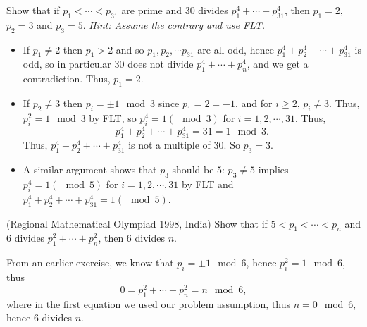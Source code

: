 \documentclass[11pt,dvipsnames]{book}
\numberwithin{figure}{section} %
\numberwithin{table}{section} %
\begin{document}
\begin{exercise} Show that if $p_{1}<\cdots < p_{31}$ are prime and $30$ divides $p_{1}^{4}+\cdots + p_{31}^{4}$, then $p_{1}=2$, $p_{2}=3$ and $p_{3}=5$. {\it Hint: Assume the contrary and use FLT.}

\begin{solution}

\begin{itemize}
\item  If $p_1\neq 2$ then $p_1>2$ and so $p_1,p_2,\cdots p_{31}$ are all odd, hence $p_1^4+p_2^4+\cdots+p_{31}^4$ is odd, so in particular $30$ does not divide $ p_{1}^{4}+\cdots + p_{n}^{4}$, and we get a contradiction. Thus, $p_{1}=2$.

\item If $p_2\neq 3$ then $p_{i} = \pm 1\mod 3$ since $p_{1}=2 = -1$, and for $i\geq 2$, $p_{i}\neq 3$. Thus, $p_{i}^{2} = 1\mod 3$ by FLT, so $p_i^{4} = 1(\mod 3)$ for $i=1,2,\cdots,31$. Thus,
\[
p_1^4+p_2^4+\cdots+p_{31}^4 = 31 = 1 \mod 3.
\]
Thus, $p_1^4+p_2^4+\cdots+p_{31}^4$ is not a multiple of $30$. So $p_3=3$.
\item A similar argument shows that $p_3$ should be $5$: $p_3\neq 5 $ implies $ p_i^4 = 1 (\mod 5)$ for $i=1,2,\cdots,31$ by FLT and $p_1^4+p_2^4+\cdots+p_{31}^4 = 1 (\mod 5)$.
\end{itemize}
\end{solution}

\end{exercise}

\begin{exercise} (Regional Mathematical Olympiad 1998, India) Show that if $5<p_{1}<\cdots < p_{n}$ and $6$ divides $p_{1}^{2}+\cdots + p_{n}^{2}$, then $6$ divides $n$.

\begin{solution}
From an earlier exercise, we know that $p_{i} = \pm 1 \mod 6$, hence $p_{i}^{2} = 1 \mod 6$, thus
\[
0=p_{1}^{2}+\cdots + p_{n}^{2}  = n\mod 6,
\]
where in the first equation we used our problem assumption, thus $n = 0\mod 6$, hence $6$ divides $n$.
\end{solution}

\end{exercise}

%
%
\end{document}

